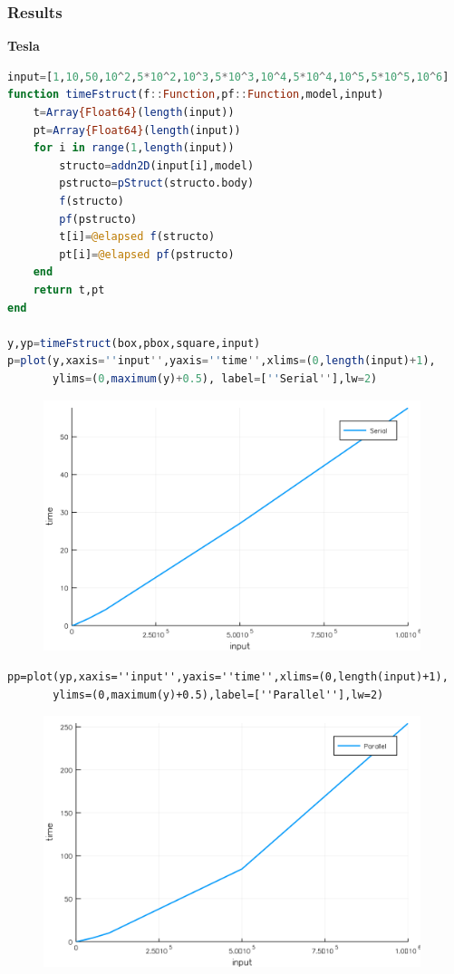 \documentclass[a4paper,12pt]{article}
\begin{document}
\subsubsection{Results}
\textbf{Tesla}
\begin{lstlisting}[language=Julia]
input=[1,10,50,10^2,5*10^2,10^3,5*10^3,10^4,5*10^4,10^5,5*10^5,10^6]
function timeFstruct(f::Function,pf::Function,model,input)
	t=Array{Float64}(length(input))
	pt=Array{Float64}(length(input))
	for i in range(1,length(input))
	    structo=addn2D(input[i],model)
	    pstructo=pStruct(structo.body)
	    f(structo)
	    pf(pstructo)
	    t[i]=@elapsed f(structo)
	    pt[i]=@elapsed pf(pstructo)
	end
	return t,pt
end

y,yp=timeFstruct(box,pbox,square,input)
p=plot(y,xaxis=''input'',yaxis=''time'',xlims=(0,length(input)+1),
       ylims=(0,maximum(y)+0.5), label=[''Serial''],lw=2)
\end{lstlisting}
\begin{figure}[ht!]
\includegraphics[width=11cm,scale=0.3]{box.png}
\end{figure}
\newpage
\begin{verbatim}
pp=plot(yp,xaxis=''input'',yaxis=''time'',xlims=(0,length(input)+1),
       ylims=(0,maximum(y)+0.5),label=[''Parallel''],lw=2)
\end{verbatim}
\begin{figure}[ht!]
\centering
\includegraphics[width=11cm,scale=0.3]{pbox.png}
\end{figure}
\end{document}
